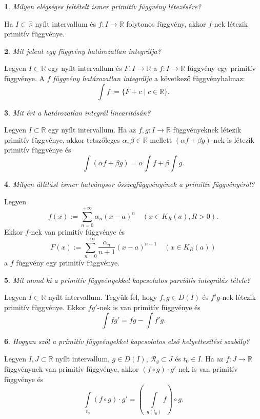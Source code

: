 \documentclass[a4paper]{article}
\def\R{\mathbb{R}}
\theoremstyle{qstyle}
\newtheorem{question}{}{}
\begin{document}
	\begin{question}
		Milyen elégséges feltételt ismer primitív függvény létezésére?
	\end{question}
	Ha $I\subset\R$ nyílt intervallum és $f:I\to\R$ folytonos függvény, akkor $f$-nek létezik primitív függvénye.
	
	\begin{question}
		Mit jelent egy függvény határozatlan integrálja?
	\end{question}
	Legyen $I\subset\R$ egy nyílt intervallum és $F:I\to\R$ a $f:I\to\R$ függvény egy primitív függvénye. A $f$ \emph{függvény határozatlan integrálja} a következő függvényhalmaz:
	$$\int f := \{F+c \mid c\in\R \} \text{.} $$
	
	\begin{question}
		Mit ért a határozatlan integrál linearitásán?
	\end{question}
	Legyen $I\subset\R$ egy nyílt intervallum. Ha az $f,g : I\to\R$ függvényeknek létezik primitív függvénye, akkor tetszőleges $\alpha,\beta\in\R$ mellett $(\alpha f+\beta g)$-nek is létezik primitív függvénye és
	$$\int (\alpha f+\beta g) = \alpha \int f + \beta \int g \text{.}$$
	
	\newpage
	
	\begin{question}
		Milyen állítást ismer hatványsor összegfüggvényének a primitív függvényéről?
	\end{question}
	Legyen
	$$f(x) := \sum_{n=0}^{+\infty} \alpha_n (x-a)^n  \quad  (x\in K_R (a), R>0 ) \text{.} $$
	Ekkor $f$-nek van primitív függvénye és
	$$F(x) := \sum_{n=0}^{+\infty} \frac{\alpha_n}{n+1} (x-a)^{n+1} \quad (x\in K_R(a)) $$
	a $f$ függvény egy primitív függvénye.
	
	\begin{question}
		Mit mond ki a primitív függvényekkel kapcsolatos \emph{parciális integrálás tétele}?
	\end{question}
	Legyen $I\subset\R$ nyílt intervallum. Tegyük fel, hogy $f,g\in D(I)$ és $f'g$-nek létezik primitív függvénye. Ekkor $fg'$-nek is van primitív függvénye és
	$$\int fg' = fg-\int f'g \text{.} $$
	
	\begin{question}
		Hogyan szól a primitív függvényekkel kapcsolatos \emph{első helyettesítési szabály}?
	\end{question}
	Legyen $I,J \subset \R$ nyílt intervallum, $g \in D(I)$, $\mathcal{R}_g \subset J$ és $t_0 \in I$. Ha az $f : J \to \R$ függvénynek van primitív függvénye, akkor $(f \circ g) \cdot g'$-nek is van primitív függvénye és
	$$ \int\limits_{t_0}(f \circ g) \cdot g' = \left(\; \int\limits_{g(t_0)} f \right) \circ g \text{.} $$
	
\end{document}
